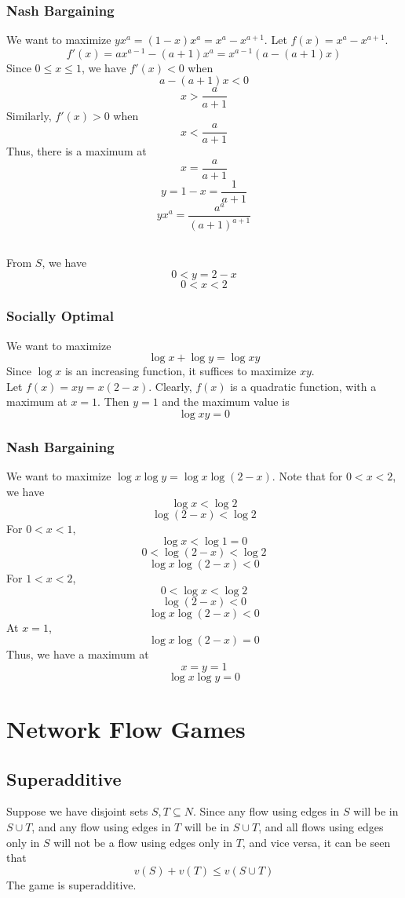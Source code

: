 \subsubsection{Nash Bargaining}
We want to maximize $yx^a=(1-x)x^a=x^a-x^{a+1}$.
Let $f(x)=x^a-x^{a+1}$.
\[f'(x)=ax^{a-1}-(a+1)x^a=x^{a-1}(a-(a+1)x)\]
Since $0\leq x \leq 1$, we have $f'(x) < 0$ when
\[a-(a+1)x<0\]
\[x>\frac{a}{a+1}\]
Similarly, $f'(x)>0$ when
\[x<\frac{a}{a+1}\]
Thus, there is a maximum at 
\[x=\frac{a}{a+1}\]
\[y=1-x=\frac{1}{a+1}\]
\[yx^a=\frac{a^a}{(a+1)^{a+1}}\]


\subsection{}

From $S$, we have
\[0< y=2-x\]
\[0< x< 2\]

\subsubsection{Socially Optimal}
We want to maximize 
\[\log x + \log y = \log xy\]
Since $\log x$ is an increasing function, it suffices to maximize $xy$.\\
Let $f(x)=xy=x(2-x)$. Clearly, $f(x)$ is a quadratic function,
with a maximum at $x=1$. Then $y=1$ and the maximum value is
\[\log xy =0\]

\subsubsection{Nash Bargaining}
We want to maximize $\log x \log y=\log x \log(2-x)$.
Note that for $0<x<2$, we have
\[\log x < \log 2\]
\[\log (2-x) < \log 2\]
For $0<x<1$,
\[\log x < \log 1=0\]
\[0 < \log (2-x) < \log 2\]
\[\log x \log (2-x) < 0\]
For $1<x<2$,
\[0 < \log x < \log 2\]
\[\log (2-x) < 0\]
\[\log x \log (2-x) < 0\]
At $x=1$,
\[\log x \log (2-x) = 0\]
Thus, we have a maximum at
\[x=y=1\]
\[\log x \log y = 0\]


\newpage
\section{Network Flow Games}

\subsection{Superadditive}
Suppose we have disjoint sets $S,T\subseteq N$.
Since any flow using edges in $S$ will be in $S\cup T$,
and any flow using edges in $T$ will be in $S\cup T$,
and all flows using edges only in $S$ will not be a flow
using edges only in $T$, and vice versa, 
it can be seen that
\[v(S) + v(T) \leq v(S\cup T)\]
The game is superadditive.


